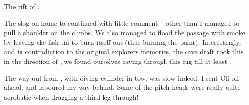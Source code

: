 \begin{marginfigure}
\checkoddpage \ifoddpage \forcerectofloat \else \forceversofloat \fi
\centering
 \caption{The rift of . }
 \label{Memory Lane}
\end{marginfigure}


The slog on home to  continued with little comment -- other
than I managed to pull a shoulder on the  climbs. We also
managed to flood the passage with smoke by leaving the fish tin to burn
itself out (thus burning the paint). Interestingly, and in contradiction
to the original explorers memories, the cave draft took this in the
direction of , we found ourselves caving through this fug till
at least .

The way out from , with diving cylinder in tow, was slow
indeed. I sent Oli off ahead, and laboured my way behind. Some of the
 pitch heads were really quite acrobatic when dragging a
third leg through!



